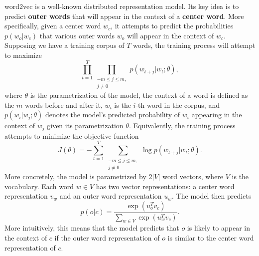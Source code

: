 word2vec is a well-known distributed representation model. Its key idea is to predict \textbf{outer words} that will appear in the context of a \textbf{center word}. More specifically, given a center word $w_c$, it attempts to predict the probabilities $p(w_o | w_c)$ that various outer words $w_o$ will appear in the context of $w_c$. Supposing we have a training corpus of $T$ words, the training process will attempt to maximize
$$\prod_{t=1}^T\prod_{\substack{-m \le j \le m,\\ j \ne 0}}p(w_{t+j} | w_t; \theta),$$
where $\theta$ is the parametrization of the model, the context of a word is defined as the $m$ words before and after it, $w_i$ is the $i$-th word in the corpus, and $p(w_i | w_j; \theta)$ denotes the model's predicted probability of $w_i$ appearing in the context of $w_j$ given its parametrization $\theta$. Equivalently, the training process attempts to minimize the objective function
$$J(\theta) = -\sum_{t=1}^T\sum_{\substack{-m \le j \le m,\\ j \ne 0}} \log p(w_{t+j} | w_t; \theta).$$
More concretely, the model is parametrized by $2|V|$ word vectors, where $V$ is the vocabulary. Each word $w \in V$ has two vector representations: a center word representation $v_w$ and an outer word representation $u_w$. The model then predicts
$$p(o | c) = \frac{\exp\left(u_o^T v_c\right)}{\sum_{w \in V} \exp\left(u_w^T v_c\right)}.$$
More intuitively, this means that the model predicts that $o$ is likely to appear in the context of $c$ if the outer word representation of $o$ is similar to the center word representation of $c$.

